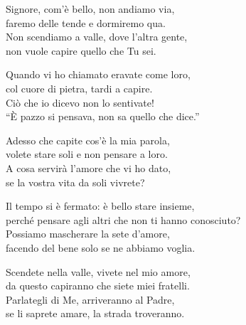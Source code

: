 
\strofa Signore, com'è bello, non andiamo via,\\
faremo delle tende e dormiremo qua.\\
Non scendiamo a valle, dove l'altra gente,\\
non vuole capire quello che Tu sei.

\spazio


\spazio

\strofa Quando vi ho chiamato eravate come loro,\\
col cuore di pietra, tardi a capire.\\
Ciò che io dicevo non lo sentivate!\\
``È pazzo si pensava, non sa quello che dice.''

\spazio


\spazio

\strofa  Adesso che capite cos'è la mia parola,\\
volete stare soli e non pensare a loro.\\
A cosa servirà l'amore che vi ho dato,\\
se la vostra vita da soli vivrete?

\spazio


\spazio

\strofa Il tempo si è fermato: è bello stare insieme,\\
perché pensare agli altri che non ti hanno conosciuto?\\
Possiamo mascherare la sete d'amore,\\
facendo del bene solo se ne abbiamo voglia.

\spazio


\spazio

\strofa Scendete nella valle, vivete nel mio amore,\\
da questo capiranno che siete miei fratelli.\\
Parlategli di Me, arriveranno al Padre,\\
se li saprete amare, la strada troveranno.

\spazio

